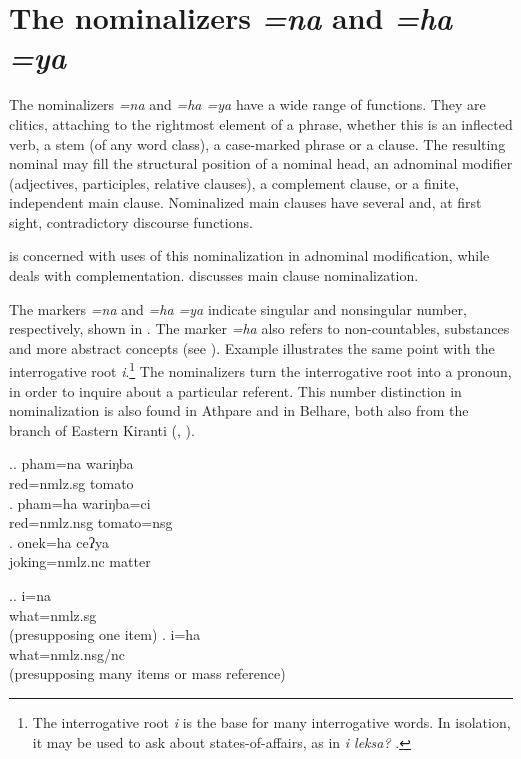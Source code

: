  
\section{The nominalizers \emph{=na} and \emph{=ha \ti =ya} }\label{nmlz-uni}

  
The nominalizers \emph{=na} and \emph{=ha \ti =ya}  have a wide range of functions. They are clitics, attaching to the rightmost element of a phrase, whether this is an inflected verb, a stem (of any word class), a case-marked phrase or a clause. The resulting nominal may  fill the structural position of a nominal head, an adnominal modifier (adjectives, participles, relative clauses), a complement clause, or a finite,  independent  main clause. Nominalized main clauses have several and, at first sight, contradictory discourse functions.

 is concerned with uses of this nominalization in adnominal modification, while  deals with complementation.  discusses main clause nominalization.


The markers \emph{=na} and \emph{=ha \ti =ya} indicate singular and nonsingular number, respectively, shown in \Next. The marker \emph{=ha} also refers to non-countables, substances and more abstract concepts (see \Next[c]). Example \NNext illustrates the same point with the interrogative root \emph{i}.\footnote{The interrogative root \emph{i} is the base for many interrogative words. In isolation, it may be used to ask about states-of-affairs, as in  \emph{i leksa?} .} The nominalizers turn the interrogative root into a pronoun, in order to inquire about a particular referent. This number distinction in nominalization is also found in Athpare and in Belhare, both also from the  branch of Eastern Kiranti (\citealt[130]{Ebert1997A-grammar}, \citealt[278]{Bickel1999Nominalization}).


\ex.\ag. pham=na wariŋba\\
red{\sc =nmlz.sg} tomato\\
\bg. pham=ha wariŋba=ci\\
red{\sc =nmlz.nsg} tomato{\sc =nsg}\\
\bg. onek=ha ceʔya\\
joking{\sc =nmlz.nc} matter\\

\ex.\ag. i=na\\
what{\sc =nmlz.sg}\\
 (presupposing one item)
\bg. i=ha\\
what{\sc =nmlz.nsg/nc}\\
 (presupposing many items or mass reference)



